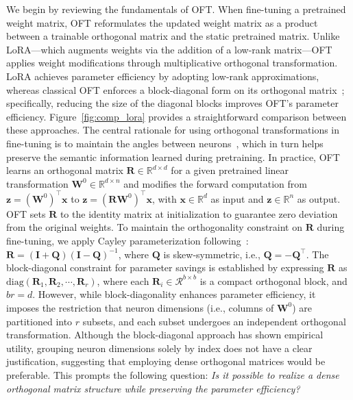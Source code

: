 We begin by reviewing the fundamentals of OFT. When fine-tuning a pretrained weight matrix, OFT reformulates the updated weight matrix as a product between a trainable orthogonal matrix and the static pretrained matrix. Unlike LoRA—which augments weights via the addition of a low-rank matrix—OFT applies weight modifications through multiplicative orthogonal transformation. LoRA achieves parameter efficiency by adopting low-rank approximations, whereas classical OFT enforces a block-diagonal form on its orthogonal matrix~\cite{qiu2023controlling}; specifically, reducing the size of the diagonal blocks improves OFT's parameter efficiency. Figure~\ref{fig:comp_lora} provides a straightforward comparison between these approaches. The central rationale for using orthogonal transformations in fine-tuning is to maintain the angles between neurons~\cite{liu2018learning,liu2021orthogonal,qiu2023controlling}, which in turn helps preserve the semantic information learned during pretraining. In practice, OFT learns an orthogonal matrix $\bm{R}\in\mathbb{R}^{d\times d}$ for a given pretrained linear transformation $\bm{W}^0\in\mathbb{R}^{d\times n}$ and modifies the forward computation from $\bm{z}=(\bm{W}^0)^\top\bm{x}$ to $\bm{z}=(\bm{R}\bm{W}^0)^\top\bm{x}$, with $\bm{x}\in\mathbb{R}^{d}$ as input and $\bm{z}\in\mathbb{R}^{n}$ as output. OFT sets $\bm{R}$ to the identity matrix at initialization to guarantee zero deviation from the original weights. To maintain the orthogonality constraint on $\bm{R}$ during fine-tuning, we apply Cayley parameterization following~\cite{qiu2023controlling,liu2021orthogonal}: $\bm{R}=(\bm{I}+\bm{Q})(\bm{I}-\bm{Q})^{-1}$, where $\bm{Q}$ is skew-symmetric, i.e., $\bm{Q}=-\bm{Q}^\top$. The block-diagonal constraint for parameter savings is established by expressing $\bm{R}$ as $\text{diag}(\bm{R}_1,\bm{R}_2,\cdots,\bm{R}_r)$, where each $\bm{R}_i\in\mathcal{R}^{b\times b}$ is a compact orthogonal block, and $br=d$. However, while block-diagonality enhances parameter efficiency, it imposes the restriction that neuron dimensions (i.e., columns of $\bm{W}^0$) are partitioned into $r$ subsets, and each subset undergoes an independent orthogonal transformation. Although the block-diagonal approach has shown empirical utility, grouping neuron dimensions solely by index does not have a clear justification, suggesting that employing dense orthogonal matrices would be preferable. This prompts the following question: \emph{Is it possible to realize a dense orthogonal matrix structure while preserving the parameter efficiency?}

